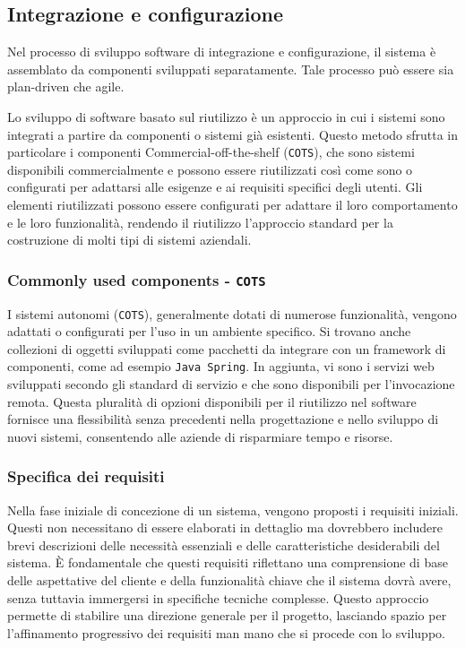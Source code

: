 \subsection{Integrazione e configurazione}
Nel processo di sviluppo software di integrazione e configurazione, il sistema 
è assemblato da componenti sviluppati separatamente. Tale processo può essere
sia plan-driven che agile.

Lo sviluppo di software basato sul riutilizzo è un approccio in cui i sistemi
sono integrati a partire da componenti o sistemi già esistenti. Questo metodo
sfrutta in particolare i componenti Commercial-off-the-shelf (\texttt{COTS}),
che sono sistemi disponibili commercialmente e possono essere riutilizzati così
come sono o configurati per adattarsi alle esigenze e ai requisiti specifici degli
utenti. Gli elementi riutilizzati possono essere configurati per adattare il loro
comportamento e le loro funzionalità, rendendo il riutilizzo l'approccio standard
per la costruzione di molti tipi di sistemi aziendali.
\subsubsection{Commonly used components - \texttt{COTS}}
I sistemi autonomi (\texttt{COTS}), generalmente dotati di numerose funzionalità, vengono
adattati o configurati per l'uso in un ambiente specifico. Si trovano anche collezioni
di oggetti sviluppati come pacchetti da integrare con un framework di componenti,
come ad esempio \texttt{Java Spring}. In aggiunta, vi sono i servizi web sviluppati secondo
gli standard di servizio e che sono disponibili per l'invocazione remota. Questa
pluralità di opzioni disponibili per il riutilizzo nel software fornisce una
flessibilità senza precedenti nella progettazione e nello sviluppo di nuovi sistemi,
consentendo alle aziende di risparmiare tempo e risorse.
\subsubsection{Specifica dei requisiti}
Nella fase iniziale di concezione di un sistema, vengono proposti i requisiti
iniziali. Questi non necessitano di essere elaborati in dettaglio ma dovrebbero
includere brevi descrizioni delle necessità essenziali e delle caratteristiche
desiderabili del sistema. È fondamentale che questi requisiti riflettano una
comprensione di base delle aspettative del cliente e della funzionalità chiave
che il sistema dovrà avere, senza tuttavia immergersi in specifiche tecniche
complesse. Questo approccio permette di stabilire una direzione generale per
il progetto, lasciando spazio per l'affinamento progressivo dei requisiti man
mano che si procede con lo sviluppo.
